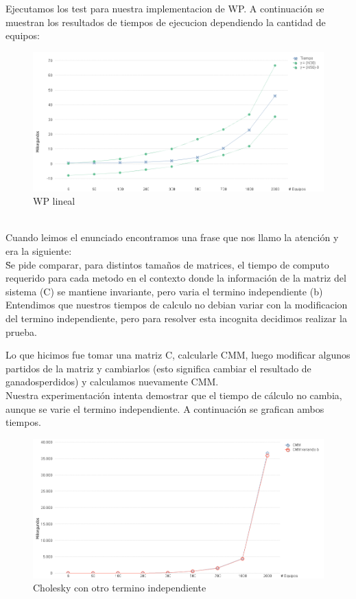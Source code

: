 Ejecutamos los test para nuestra implementacion de WP. A continuación se muestran los resultados de tiempos de ejecucion dependiendo la cantidad de equipos: \\


\begin{figure}[H]
\centering
\includegraphics[width=1\textwidth]{IMG/wp lineal.png}
\caption{WP lineal}
\label{fig:WP lineal}
\end{figure}

\\


Cuando leimos el enunciado encontramos una frase que nos llamo la atención y era la siguiente: \\

\"Se pide comparar, para distintos tamaños de matrices, el tiempo de computo requerido para cada metodo en el contexto donde la información de la matriz del sistema (C) se mantiene invariante, 
pero varia el termino independiente (b)\"\\

Entendimos que nuestros tiempos de calculo no debian variar con la modificacion del termino independiente, pero para resolver esta incognita decidimos realizar la prueba.

Lo que hicimos fue tomar una matriz C, calcularle CMM, luego modificar algunos partidos de la matriz y cambiarlos (esto significa cambiar el resultado de ganados\/perdidos) y calculamos 
nuevamente CMM. \\

Nuestra experimentación intenta demostrar que el tiempo de cálculo no cambia, aunque se varie el termino independiente.
A continuación se grafican ambos tiempos.\\

\begin{figure}[H]
\centering
\includegraphics[width=1\textwidth]{IMG/Cholesky con otro termino independiente.png}
\caption{Cholesky con otro termino independiente}
\label{fig:Cholesky con otro termino independiente}
\end{figure}
